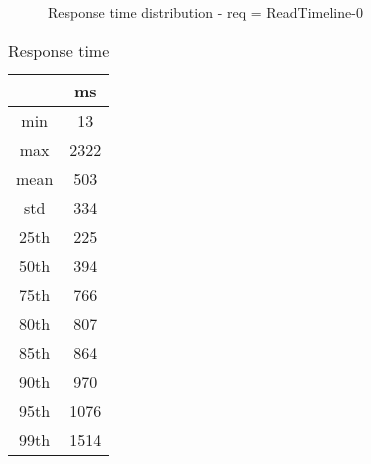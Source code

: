 \begin{minipage}{0.75\linewidth}
\begin{figure}[h]
\begin{adjustbox}{max width=1.0\linewidth, keepaspectratio}
  \end{adjustbox}
  \caption{Response time distribution - req = ReadTimeline-0}
\end{figure}
\end{minipage}\hfill\begin{minipage}{0.18\linewidth}
\begin{table}[h]
\begin{tabular}{|cc|}
\hline
\textbf{} & \textbf{ms}\\ \hline
 \Xhline{0.005\arrayrulewidth}
min & 13\\
 \Xhline{0.005\arrayrulewidth}
max & 2322\\
 \Xhline{0.005\arrayrulewidth}
mean & 503\\
 \Xhline{0.005\arrayrulewidth}
std & 334\\
\hline
\hline
 \Xhline{0.005\arrayrulewidth}
25th & 225\\
 \Xhline{0.005\arrayrulewidth}
50th & 394\\
 \Xhline{0.005\arrayrulewidth}
75th & 766\\
 \Xhline{0.005\arrayrulewidth}
80th & 807\\
 \Xhline{0.005\arrayrulewidth}
85th & 864\\
 \Xhline{0.005\arrayrulewidth}
90th & 970\\
 \Xhline{0.005\arrayrulewidth}
95th & 1076\\
 \Xhline{0.005\arrayrulewidth}
99th & 1514\\
\hline
\end{tabular}
\caption{Response time}
\end{table}
\end{minipage}\hfill